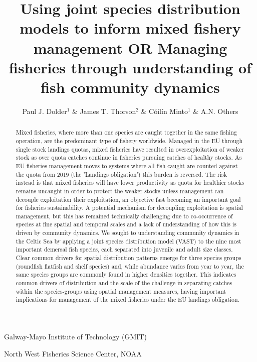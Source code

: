 \documentclass{nature}
\title{Using joint species distribution models to inform mixed fishery
	management OR Managing fisheries through understanding of fish
	community dynamics}
\author{Paul J. Dolder$^1$ \& James T. Thorson$^2$ \& Cóilín Minto$^1$ \& A.N.
Others}
\begin{document}
\maketitle

\begin{affiliations}
\item Galway-Mayo Institute of Technology (GMIT) 
\item North West Fisheries Science Center, NOAA
\end{affiliations}

\begin{linenumbers}

\begin{abstract} 
Mixed fisheries, where more than one species are caught together in the same
fishing operation, are the predominant type of fishery worldwide. Managed in
the EU through single stock landings quotas, mixed fisheries have resulted in
overexploitation of weaker stock as over quota catches continue in fisheries
pursuing catches of healthy stocks. As EU fisheries management moves to systems
where all fish caught are counted against the quota from 2019 (the 'Landings
obligation') this burden is reversed. The risk instead is that mixed fisheries
will have lower productivity as quota for healthier stocks remains uncaught in
order to protect the weaker stocks unless management can decouple exploitation
their exploitation, an objective fast becoming an important goal for fisheries
sustainability.  A potential mechanism for decoupling exploitation is spatial
management, but this has remained technically challenging due to co-occurrence
of species at fine spatial and temporal scales and a lack of understanding of
how this is driven by community dynamics.  We sought to understanding community
dynamics in the Celtic Sea by applying a joint species distribution model
(VAST) to the nine most important demersal fish species, each separated into
juvenile and adult size classes.  \\

Clear common drivers for spatial distribution patterns emerge for three species
groups (roundfish flatfish and shelf species) and, while abundance varies from
year to year, the same species groups are commonly found in higher densities
together. This indicates common drivers of distribution and the scale of the
challenge in separating catches within the species-groups using spatial
management measures, having important implications for management of the mixed
fisheries under the EU landings obligation.


\end{abstract}
\end{linenumbers}
\end{document}
